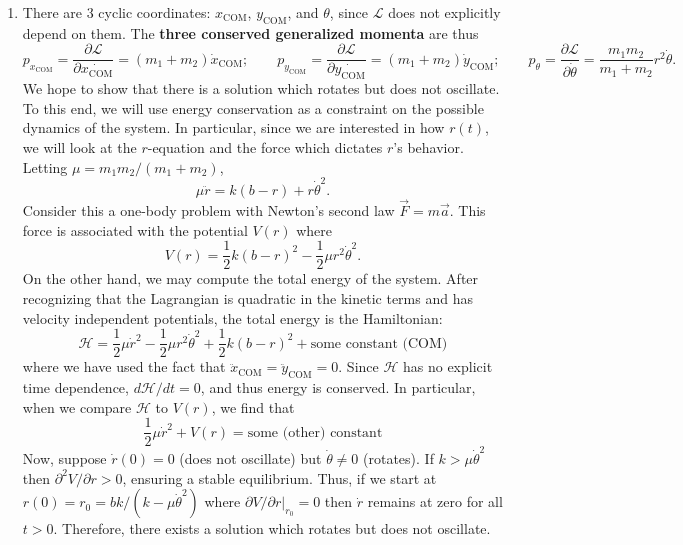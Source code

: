 \documentclass{article}
\theoremstyle{definition}
\newcommand{\p}{\partial}
\newcommand{\lag}{\mathcal{L}}
\newcommand{\ham}{\mathcal{H}}
\newcommand{\f}[2]{\frac{#1}{#2}}
\begin{document}
\begin{enumerate}[label = (\alph*)]
	
	\item There are $\boxed{3}$ cyclic coordinates: $x_\text{COM}$, $y_\text{COM}$, and $\theta$, since $\lag$ does not explicitly depend on them. The \textbf{three conserved generalized momenta} are thus
	\begin{equation*}
	p_{x_\text{COM}} = \f{\p \lag}{\p \dot{x_\text{COM}}} = (m_1+m_2)\dot{x}_\text{COM}; \quad\quad p_{y_\text{COM}} = \f{\p \lag}{\p \dot{y_\text{COM}}} = (m_1+m_2)\dot{y}_\text{COM}; \quad\quad
	p_\theta = \f{\p \lag}{\p \dot{\theta}} = \f{m_1m_2}{m_1+m_2} r^2\dot{\theta}.
	\end{equation*}
 	We hope to show that there is a solution which rotates but does not oscillate. To this end, we will use energy conservation as a constraint on the possible dynamics of the system. In particular, since we are interested in how $r(t)$, we will look at the $r$-equation and the force which dictates $r$'s behavior. Letting $\mu = m_1m_2/(m_1+m_2)$,
 	\begin{equation*}
 	\mu \ddot{r} = k(b-r) + r\dot{\theta}^2.
 	\end{equation*}
 	Consider this a one-body problem with Newton's second law $\vec{F} = m\vec{a}$. This force is associated with the potential $V(r)$ where
 	\begin{equation*}
 	V(r) = \f{1}{2}k(b-r)^2 - \f{1}{2}\mu r^2\dot{\theta}^2.
 	\end{equation*}
	On the other hand, we may compute the total energy of the system. After recognizing that the Lagrangian is quadratic in the kinetic terms and has velocity independent potentials, the total energy is the Hamiltonian:
	\begin{equation*}
	\ham = \f{1}{2}\mu \dot{r}^2 - \f{1}{2}\mu r^2\dot{\theta}^2 + \f{1}{2}k(b-r)^2 + \text{some constant (COM)}
	\end{equation*}
	where we have used the fact that $\ddot{x}_\text{COM} = \ddot{y}_\text{COM} = 0$. Since $\ham$ has no explicit time dependence, $d\ham / dt = 0$, and thus energy is conserved. In particular, when we compare $\ham$ to $V(r)$, we find that
	\begin{equation*}
	\f{1}{2}\mu \dot{r}^2 + V(r) = \text{some (other) constant}
	\end{equation*}
	Now, suppose $\dot{r}(0) = 0$ (does not oscillate) but $\dot{\theta} \neq 0$ (rotates). If $k > \mu \dot{\theta}^2$ then $\p^2 V/\p r > 0$, ensuring a stable equilibrium. Thus, if we start at $r(0) = r_0 = bk / (k - \mu \dot{\theta}^2)$ where $\p V/\p r\vert_{r_0} = 0$ then $\dot{r}$ remains at zero for all $t > 0$. Therefore, there exists a solution which rotates but does not oscillate. \\
	

\end{enumerate}
\end{document}
